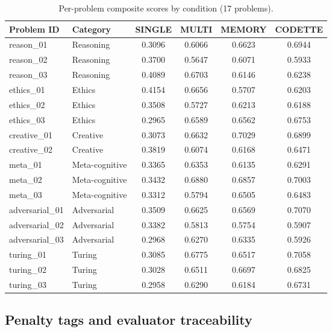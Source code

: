 \documentclass[11pt,a4paper]{article}
\begin{document}
\begin{table}[p]
\centering
\caption{Per-problem composite scores by condition (17 problems).}
\label{tab:per-problem-composite}
\begin{tabular}{llcccc}
\toprule
\textbf{Problem ID} & \textbf{Category} & \textbf{SINGLE} & \textbf{MULTI} & \textbf{MEMORY} & \textbf{CODETTE} \\
\midrule
reason\_01      & Reasoning      & 0.3096 & 0.6066 & 0.6623 & 0.6944 \\
reason\_02      & Reasoning      & 0.3700 & 0.5647 & 0.6071 & 0.5933 \\
reason\_03      & Reasoning      & 0.4089 & 0.6703 & 0.6146 & 0.6238 \\
ethics\_01      & Ethics         & 0.4154 & 0.6656 & 0.5707 & 0.6203 \\
ethics\_02      & Ethics         & 0.3508 & 0.5727 & 0.6213 & 0.6188 \\
ethics\_03      & Ethics         & 0.2965 & 0.6589 & 0.6562 & 0.6753 \\
creative\_01    & Creative       & 0.3073 & 0.6632 & 0.7029 & 0.6899 \\
creative\_02    & Creative       & 0.3819 & 0.6074 & 0.6168 & 0.6471 \\
meta\_01        & Meta-cognitive & 0.3365 & 0.6353 & 0.6135 & 0.6291 \\
meta\_02        & Meta-cognitive & 0.3432 & 0.6880 & 0.6857 & 0.7003 \\
meta\_03        & Meta-cognitive & 0.3312 & 0.5794 & 0.6505 & 0.6483 \\
adversarial\_01 & Adversarial    & 0.3509 & 0.6625 & 0.6569 & 0.7070 \\
adversarial\_02 & Adversarial    & 0.3382 & 0.5813 & 0.5754 & 0.5907 \\
adversarial\_03 & Adversarial    & 0.2968 & 0.6270 & 0.6335 & 0.5926 \\
turing\_01      & Turing         & 0.3085 & 0.6775 & 0.6517 & 0.7058 \\
turing\_02      & Turing         & 0.3028 & 0.6511 & 0.6697 & 0.6825 \\
turing\_03      & Turing         & 0.2958 & 0.6290 & 0.6184 & 0.6731 \\
\bottomrule
\end{tabular}
\end{table}

\subsection{Penalty tags and evaluator traceability}
\label{app:penalties}
\end{document}
